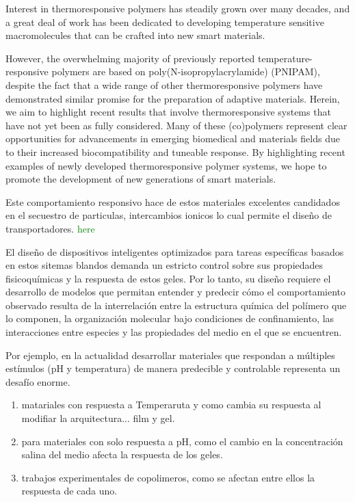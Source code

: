 Interest in thermoresponsive polymers has steadily grown over many decades, and a great deal of work has been dedicated to developing temperature sensitive macromolecules that can be crafted into new smart materials. 

However, the overwhelming majority of previously reported temperature-responsive polymers are based on poly(N-isopropylacrylamide) (PNIPAM), despite the fact that a wide range of other thermoresponsive polymers have demonstrated similar promise for the preparation of adaptive materials. Herein, we aim to highlight recent results that involve thermoresponsive systems that have not yet been as fully considered. Many of these (co)polymers represent clear opportunities for advancements in emerging biomedical and materials fields due to their increased biocompatibility and tuneable response. By highlighting recent examples of newly developed thermoresponsive polymer systems, we hope to promote the development of new generations of smart materials.


Este comportamiento responsivo hace de estos materiales excelentes candidados en el secuestro de particulas, intercambios ionicos lo cual permite el dise\~no de transportadores. 
\textcolor{green}{here}

El diseño de dispositivos inteligentes optimizados para tareas específicas basados en estos sitemas blandos demanda un estricto control sobre sus propiedades fisicoquímicas y la respuesta de estos geles.
Por lo tanto, su diseño  requiere el desarrollo de modelos que permitan entender y predecir cómo el comportamiento observado resulta de la interrelación entre la estructura química del polímero que lo componen, la organización molecular bajo condiciones de confinamiento,  las interacciones entre especies y las propiedades del medio en el que se encuentren.


Por ejemplo, en la actualidad desarrollar materiales que respondan a múltiples estímulos (pH y temperatura) de manera predecible y controlable representa un desafío enorme. \addcite
\begin{enumerate}
    \item matariales con respuesta a Temperaruta y como cambia su respuesta al modifiar la arquitectura... film y gel.
    \item para materiales con solo respuesta a pH, como el cambio en la concentraci\'on salina del medio afecta la respuesta de los geles.
    \item trabajos experimentales de copolimeros, como se afectan entre ellos la respuesta de cada uno.
\end{enumerate}

